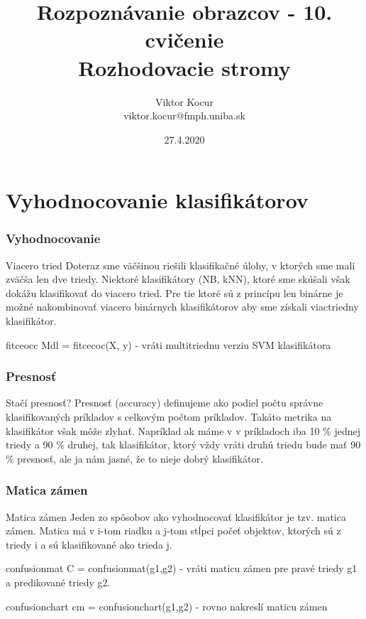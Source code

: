 \documentclass{beamer}
\title[Validácia, Stromy]{Rozpoznávanie obrazcov - 10. cvičenie \\ Rozhodovacie stromy}
\author[Viktor Kocur]{Viktor Kocur \\{\small viktor.kocur@fmph.uniba.sk}}
\institute{DAI FMFI UK}
\date{27.4.2020}
\begin{document}

\begin{frame}[plain]
  \titlepage  
\end{frame}

\section{Vyhodnocovanie klasifikátorov}
\begin{frame}
\frametitle{Vyhodnocovanie}
  \begin{block}{Viacero tried}
  Doteraz sme väčšinou riešili klasifikačné úlohy, v ktorých sme mali zväčša len dve triedy. Niektoré klasifikátory (NB, kNN), ktoré sme skúšali však dokážu klasifikovať do viacero tried. Pre tie ktoré sú z princípu len binárne je možné nakombinovať viacero binárnych klasifikátorov aby sme získali viactriedny klasifikátor.
  \end{block}   
  
  \begin{block}{fitceocc}
  Mdl = fitcecoc(X, y) - vráti multitriednu verziu SVM klasifikátora
  \end{block}   


\end{frame}


\begin{frame}
\frametitle{Presnosť}
\begin{block}{Stačí presnosť?}
Presnosť (accuracy) definujeme ako podiel počtu správne klasifikovaných príkladov s celkovým počtom príkladov. Takáto metrika na klasifikátor však môže zlyhať. Napríklad ak máme v v príkladoch iba 10 \% jednej triedy a 90 \% druhej, tak klasifikátor, ktorý vždy vráti druhú triedu bude mať 90 \% presnosť, ale ja nám jasné, že to nieje dobrý klasifikátor.
\end{block}
\end{frame}


\begin{frame}
\frametitle{Matica zámen}
  \begin{block}{Matica zámen}
  Jeden zo spôsobov ako vyhodnocovať klasifikátor je tzv. matica zámen. Matica má v i-tom riadku a j-tom stĺpci počeť objektov, ktorých sú z triedy i a sú klasifikované ako trieda j.
  \end{block}   

  \begin{block}{confusionmat}
  C = confusionmat(g1,g2) - vráti maticu zámen pre pravé triedy g1 a predikované triedy g2.
  \end{block} 
    
  \begin{block}{confusionchart}
  cm = confusionchart(g1,g2) - rovno nakreslí maticu zámen
  \end{block}         
\end{frame}
\end{document}
